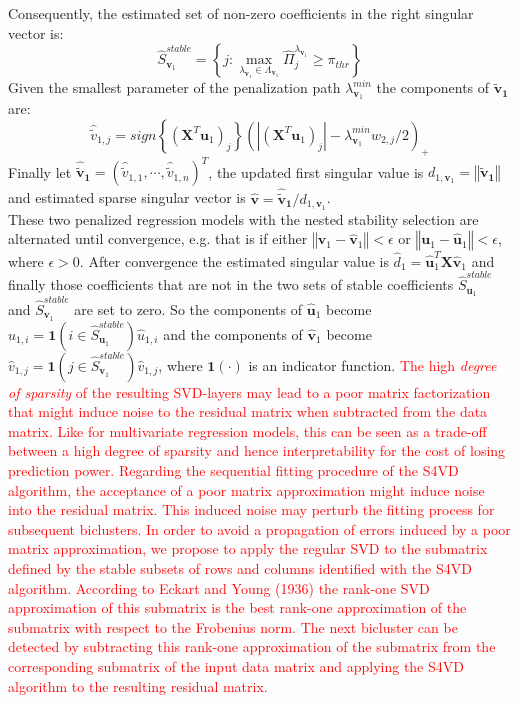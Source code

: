 \documentclass{bioinfo}
\begin{document}
\begin{methods}
Consequently, the estimated set of non-zero coefficients in the right singular vector is:
\begin{equation}
\hat{S}_{\mathbf{v}_{1}}^{stable}=\left\{j: \max_{\lambda_{\mathbf{v}_{1}} \in \Lambda_{\mathbf{v}_{1}}}\hat{\Pi}_{j}^{\lambda_{\mathbf{v}_{1}}} \geq \pi_{thr} \right\}
\end{equation}
Given the smallest parameter of the penalization path $\lambda^{min}_{\mathbf{v}_{1}}$ the components of $\mathbf{\tilde{v}_{1}}$ are:
\begin{equation}
     \hat{\tilde{v}}_{1,j}= \textit{sign}\left\{(\mathbf{X}^{T}\mathbf{u}_{1})_{j}\right\}(|(\mathbf{X}^{T}\mathbf{u}_{1})_{j}|-\lambda^{min}_{\mathbf{v}_{1}}w_{2,j}/2)_{+}
\end{equation}
Finally let $\mathbf{\hat{\tilde{v}}_{1}}=(\hat{\tilde{v}}_{1,1},\cdots,\hat{\tilde{v}}_{1,n})^{T}$, the updated first singular value is $d_{1,\mathbf{v}_{1}}=\left\Vert\mathbf{\tilde{v}_{1}}\right\Vert$ and estimated sparse singular vector is $\mathbf{\hat{v}}=\mathbf{\hat{\tilde{v}}_{1}}/d_{1,\mathbf{v}_{1}}$. \\
These two penalized regression models with the nested stability selection are alternated until convergence, e.g. that is if either $\left\Vert \mathbf{v}_{1} - \mathbf{\hat{v}}_{1}\right\Vert < \epsilon$ or $\left\Vert \mathbf{u}_{1} - \mathbf{\hat{u}}_{1} \right\Vert < \epsilon$, where $\epsilon > 0$.
After convergence the estimated singular value is $\hat{d}_{1}=\mathbf{\hat{u}}_{1}^{T}\mathbf{X}\mathbf{\hat{v}}_{1}$ and finally those coefficients that are not in the two sets of stable coefficients $\hat{S}_{\mathbf{u}_{1}}^{stable}$ and $\hat{S}_{\mathbf{v}_{1}}^{stable}$ are set to zero. So the components of $\hat{\mathbf{u}}_{1}$ become $\hat{u}_{1,i}=\mathbf{1}(i \in \hat{S}_{\mathbf{u}_{1}}^{stable})\hat{u}_{1,i}$ and the components of $\hat{\mathbf{v}}_{1}$ become $\hat{v}_{1,j}=\mathbf{1}(j \in \hat{S}_{\mathbf{v}_{1}}^{stable}  )\hat{v}_{1,j}$, where $\mathbf{1}(\cdot)$ is an indicator function.
\textcolor{red}{The high \textit{degree of sparsity} of the resulting SVD-layers may lead to a poor matrix factorization that might induce noise to the residual matrix when subtracted from the data matrix. Like for multivariate regression models, this can be seen as a trade-off between a high degree of sparsity and hence interpretability for the cost of losing prediction power. Regarding the sequential fitting procedure of the S4VD algorithm, the acceptance of a poor matrix approximation might induce noise into the residual matrix. This induced noise may perturb the fitting process for subsequent biclusters. In order to avoid a propagation of errors induced by a poor matrix approximation, we propose to apply the regular SVD to the submatrix defined by the stable subsets of rows and columns identified with the S4VD algorithm. According to Eckart and Young (1936) the rank-one SVD approximation of this submatrix is the best rank-one approximation of the submatrix with respect to the Frobenius norm. The next bicluster can be detected by subtracting this rank-one approximation of the submatrix from the corresponding submatrix of the input data matrix and applying the S4VD algorithm to the resulting residual matrix.} 

\end{methods}
\end{document}

